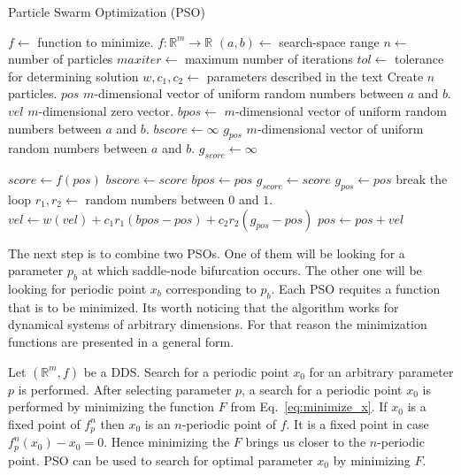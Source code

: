 \begin{algorithm}[!h]
    \caption{Particle Swarm Optimization (PSO)}
    \label{alg:pso}
    \begin{algorithmic}[1]
        \Statex $f \gets$ function to minimize. $f: \mathbb{R}^{m} \rightarrow \mathbb{R}$  
        \Statex $(a, b) \gets$ search-space range
        \Statex $n \gets$ number of particles
        \Statex $maxiter \gets$ maximum number of iterations
        \Statex $tol \gets$ tolerance for determining solution
        \Statex $w, c_{1}, c_{2} \gets$ parameters described in the text
        \State Create $n$ particles.
            \State $pos$ $m$-dimensional vector of uniform random numbers between $a$ and $b$.
            \State $vel$ $m$-dimensional zero vector.
            \State $bpos \gets$ $m$-dimensional vector of uniform random numbers between $a$ and $b$.
            \State $bscore \gets \infty$
        \EndFor
        \State $g_{pos}$ $m$-dimensional vector of uniform random numbers between $a$ and $b$.
        \State $g_{score} \gets \infty$

                \State $score \gets f(pos)$ 
                    \State $bscore \gets score$
                    \State $bpos \gets pos$
                \EndIf
                    \State $g_{score} \gets score$
                    \State $g_{pos} \gets pos$
                \EndIf
            \EndFor
                \State break the loop
            \EndIf
                \State $r_{1}, r_{2} \gets$ random numbers between $0$ and $1$.
                \State $vel \gets w(vel) + c_{1}r_{1}(bpos-pos) + c_{2}r_{2}(g_{pos}-pos)$
                \State $pos \gets pos + vel$
            \EndFor
        \EndFor
    \end{algorithmic}
\end{algorithm}

\par
The next step is to combine two PSOs.
One of them will be looking for a parameter $p_b$ at which saddle-node bifurcation occurs.
The other one will be looking for periodic point $x_b$ corresponding to $p_b$.
Each PSO requites a function that is to be minimized.
Its worth noticing that the algorithm works for dynamical systems of arbitrary dimensions.
For that reason the minimization functions are presented in a general form.
\par
Let $(\mathbb{R}^{m}, f)$ be a DDS.
Search for a periodic point $x_0$ for an arbitrary parameter $p$ is performed.
After selecting parameter $p$, a search for a periodic point $x_0$ is performed by minimizing the function $F$ from Eq.~\ref{eq:minimize_x}.
If $x_0$ is a fixed point of $f^{n}_{p}$ then $x_0$ is an $n$-periodic point of $f$.
It is a fixed point in case $f^{n}_{p}(x_0)-x_0 = 0$.
Hence minimizing the $F$ brings us closer to the $n$-periodic point.
PSO can be used to search for optimal parameter $x_0$ by minimizing $F$.

